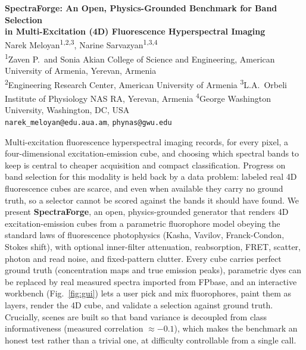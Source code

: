 \documentclass[10pt]{article}
\begin{document}
\begin{center}
{\large\bfseries SpectraForge: An Open, Physics-Grounded Benchmark for Band Selection\\
in Multi-Excitation (4D) Fluorescence Hyperspectral Imaging}\\[0.6em]
{\normalsize Narek Meloyan\textsuperscript{1,2,3}, Narine Sarvazyan\textsuperscript{1,3,4}}\\[0.2em]
{\footnotesize \textsuperscript{1}Zaven P.\ and Sonia Akian College of Science and Engineering, American University of Armenia, Yerevan, Armenia\\
\textsuperscript{2}Engineering Research Center, American University of Armenia \quad
\textsuperscript{3}L.A.\ Orbeli Institute of Physiology NAS RA, Yerevan, Armenia \quad
\textsuperscript{4}George Washington University, Washington, DC, USA\\
\texttt{narek\_meloyan@edu.aua.am}, \texttt{phynas@gwu.edu}}
\end{center}

\vspace{0.3em}

Multi-excitation fluorescence hyperspectral imaging records, for every pixel, a
four-dimensional excitation-emission cube, and choosing which spectral bands to keep is
central to cheaper acquisition and compact classification. Progress on band selection for
this modality is held back by a data problem: labeled real 4D fluorescence cubes are
scarce, and even when available they carry no ground truth, so a selector cannot be scored
against the bands it should have found. We present \textbf{SpectraForge}, an open,
physics-grounded generator that renders 4D excitation-emission cubes from a parametric
fluorophore model obeying the standard laws of fluorescence photophysics (Kasha, Vavilov,
Franck-Condon, Stokes shift), with optional inner-filter attenuation, reabsorption, FRET,
scatter, photon and read noise, and fixed-pattern clutter. Every cube carries perfect
ground truth (concentration maps and true emission peaks), parametric dyes can be replaced
by real measured spectra imported from FPbase, and an interactive workbench
(Fig.~\ref{fig:gui}) lets a user pick and mix fluorophores, paint them as layers, render the 4D cube,
and validate a selection against ground truth. Crucially, scenes are
built so that band variance is decoupled from class informativeness (measured correlation
$\approx -0.1$), which makes the benchmark an honest test rather than a trivial one, at
difficulty controllable from a single call.
\end{document}
